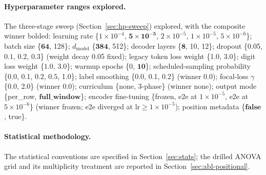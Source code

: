 \documentclass[sensors,article,submit,moreauthors,pdftex]{Definitions/mdpi}
\begin{document}
\paragraph{Hyperparameter ranges explored.}
\label{app3:repro-hp}
The three-stage sweep (Section~\ref{sec:hp-sweep}) explored, with the composite winner bolded: learning rate \{$1\!\times\!10^{-4}$, $\mathbf{5\!\times\!10^{-5}}$, $2\!\times\!10^{-5}$, $1\!\times\!10^{-5}$, $5\!\times\!10^{-6}$\}; batch size \{$\mathbf{64}$, 128\}; $d_{\text{model}}$ \{$\mathbf{384}$, 512\}; decoder layers \{$\mathbf{8}$, 10, 12\}; dropout \{0.05, $\mathbf{0.1}$, 0.2, 0.3\} (weight decay 0.05 fixed); legacy token loss weight \{1.0, $\mathbf{3.0}$\}; digit loss weight \{$\mathbf{1.0}$, 3.0\}; warmup epochs \{0, $\mathbf{10}$\}; scheduled-sampling probability \{0.0, 0.1, 0.2, $\mathbf{0.5}$, 1.0\}; label smoothing \{0.0, 0.1, 0.2\} (winner 0.0); focal-loss $\gamma$ \{0.0, 2.0\} (winner 0.0); curriculum \{none, 3-phase\} (winner none); output mode \{per\_row, $\mathbf{full\_window}$\}; encoder fine-tuning \{frozen, e2e at $1\!\times\!10^{-5}$, e2e at $5\!\times\!10^{-6}$\} (winner frozen; e2e diverged at lr$\ge\!1\!\times\!10^{-5}$); position metadata \{$\mathbf{false}$, true\}.

\paragraph{Statistical methodology.}
\label{app3:repro-stats}
The statistical conventions are specified in Section~\ref{sec:stats}; the drilled ANOVA grid and its multiplicity treatment are reported in Section~\ref{sec:abl-positional}.
\end{document}
